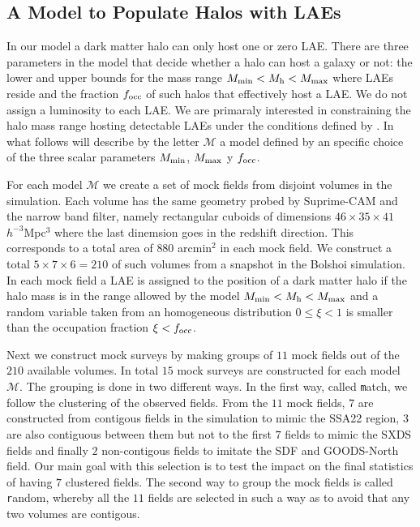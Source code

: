 \documentclass[usenatbib]{mn2e}
\begin{document}
\subsection{A Model to Populate Halos with LAEs}
\label{subsec:mocks}

In our model a dark matter halo can only host one or zero LAE. 
There are three parameters in the model that decide whether a halo can host a
galaxy or not: the lower and upper bounds for the mass range $M_{\rm min}<
M_{\rm h} < M_{\rm max}$ where LAEs reside and the fraction $f_{\rm
  occ}$ of such halos that effectively host a LAE. We do not assign a
luminosity to each LAE. We are primaraly interested in
constraining the halo mass range hosting detectable LAEs under the
conditions defined by \cite{Yamada2012}. In what follows will describe by
the letter ${\mathcal M}$ a model defined by an specific choice of the
three scalar parameters $M_{\rm min}$, $M_{\rm  max}$ y $f_{\rm occ}$.  


For each model ${\mathcal M}$ we create a set of mock fields from
disjoint volumes in the simulation. Each volume has the same geometry
probed by Suprime-CAM and the narrow band filter, namely rectangular
cuboids of dimensions $46\times 35\times 41$ $h^{-3}$Mpc$^{3}$ where
the last dinemsion goes in the redshift direction. This corresponds to
a total area of $880$ arcmin$^{2}$ in each mock field. We construct a total
$5\times 7 \times 6=210$ of such volumes from a snapshot in the Bolshoi
simulation. In each mock field a LAE is assigned to the position of a
dark matter halo if the halo mass is in the range allowed by the model
$M_{\rm min}<M_{\rm h}<M_{\rm max}$ and a random variable taken from
an homogeneous distribution $0\leq \xi<1$ is smaller than the occupation
fraction $\xi<f_{\rm occ}$.

Next we construct mock surveys by making groups of $11$ mock fields
out of the $210$ available volumes. In total $15$ mock surveys are
constructed for each model $\mathcal{M}$. The grouping is done in two
different ways. In the first way, called {\texttt match}, we follow
the clustering of the observed fields. From the $11$ mock fields, $7$
are constructed from contigous fields in the simulation to mimic the
SSA22 region, $3$ are also contiguous between them but not to the first
$7$ fields to mimic the SXDS fields and finally $2$ non-contigous
fields to imitate the SDF and GOODS-North field. Our main goal with
this selection is to test the impact on the final statistics of having
$7$ clustered fields. The second way to group the mock fields is called {\texttt
  random}, whereby all the $11$ fields are selected in such a way as
to avoid that any two volumes are contigous.
\end{document}
